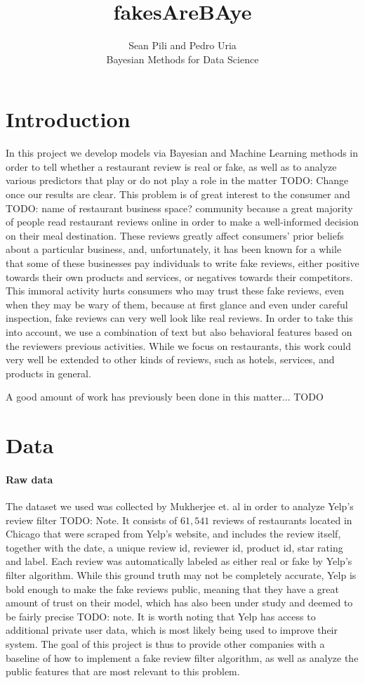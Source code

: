 \documentclass[man, floatsintext, 10pt]{apa6}
\title{fakesAreBAye}
\author{Sean Pili and Pedro Uria \\ Bayesian Methods for Data Science}
\affiliation{GWU}
\begin{document}
\maketitle

\section{Introduction}

In this project we develop models via Bayesian and Machine Learning methods in order to tell whether a restaurant review is real or fake, as well as to analyze various predictors that play or do not play a role in the matter TODO: Change once our results are clear. This problem is of great interest to the consumer and TODO: name of restaurant business space? community because a great majority of people read restaurant reviews online in order to make a well-informed decision on their meal destination. These reviews greatly affect consumers' prior beliefs about a particular business, and, unfortunately, it has been known for a while that some of these businesses pay individuals to write fake reviews, either positive towards their own products and services, or negatives towards their competitors. This immoral activity hurts consumers who may trust these fake reviews, even when they may be wary of them, because at first glance and even under careful inspection, fake reviews can very well look like real reviews. In order to take this into account, we use a combination of text but also behavioral features based on the reviewers previous activities.  While we focus on restaurants, this work could very well be extended to other kinds of reviews, such as hotels, services, and products in general.

A good amount of work has previously been done in this matter... TODO


\section{Data}

\paragraph{Raw data} The dataset we used was collected by Mukherjee et. al in order to analyze Yelp's review filter TODO: Note. It consists of  $61,541$ reviews of restaurants located in Chicago that were scraped from Yelp's website, and includes the review itself, together with the date, a unique review id, reviewer id, product id, star rating and label. Each review was automatically labeled as either real or fake by Yelp's filter algorithm. While this ground truth may not be completely accurate, Yelp is bold enough to make the fake reviews public, meaning that they have a great amount of trust on their model, which has also been under study and deemed to be fairly precise TODO: note. It is worth noting that Yelp has access to additional private user data, which is most likely being used to improve their system. The goal of this project is thus to provide other companies with a baseline of how to implement a fake review filter algorithm, as well as analyze the public features that are most relevant to this problem.
\end{document}
